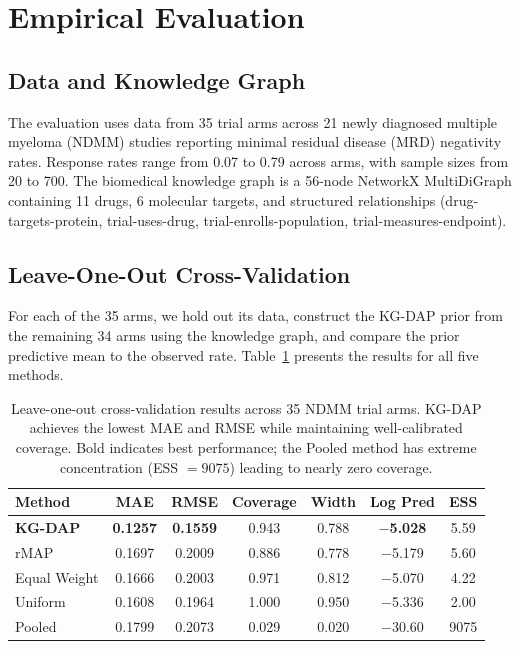 \documentclass[12pt]{article}
\begin{document}
\section{Empirical Evaluation}
\label{sec:results}

\subsection{Data and Knowledge Graph}
\label{sec:data}

The evaluation uses data from 35 trial arms across 21 newly diagnosed multiple myeloma (NDMM) studies reporting minimal residual disease (MRD) negativity rates. Response rates range from 0.07 to 0.79 across arms, with sample sizes from 20 to 700. The biomedical knowledge graph is a 56-node NetworkX MultiDiGraph containing 11 drugs, 6 molecular targets, and structured relationships (drug-targets-protein, trial-uses-drug, trial-enrolls-population, trial-measures-endpoint).

\subsection{Leave-One-Out Cross-Validation}
\label{sec:loocv}

For each of the 35 arms, we hold out its data, construct the KG-DAP prior from the remaining 34 arms using the knowledge graph, and compare the prior predictive mean to the observed rate. Table~\ref{tab:loocv} presents the results for all five methods.

\begin{table}[t]
\centering
\caption{Leave-one-out cross-validation results across 35 NDMM trial arms. KG-DAP achieves the lowest MAE and RMSE while maintaining well-calibrated coverage. Bold indicates best performance; the Pooled method has extreme concentration (ESS $= 9075$) leading to nearly zero coverage.}
\label{tab:loocv}
\begin{tabular}{lcccccc}
\toprule
Method & MAE & RMSE & Coverage & Width & Log Pred & ESS \\
\midrule
\textbf{KG-DAP}   & \textbf{0.1257} & \textbf{0.1559} & 0.943 & 0.788 & \textbf{$-$5.028} & 5.59 \\
rMAP               & 0.1697          & 0.2009          & 0.886 & 0.778 & $-$5.179          & 5.60 \\
Equal Weight       & 0.1666          & 0.2003          & 0.971 & 0.812 & $-$5.070          & 4.22 \\
Uniform            & 0.1608          & 0.1964          & 1.000 & 0.950 & $-$5.336          & 2.00 \\
Pooled             & 0.1799          & 0.2073          & 0.029 & 0.020 & $-$30.60          & 9075 \\
\bottomrule
\end{tabular}
\end{table}
\end{document}
